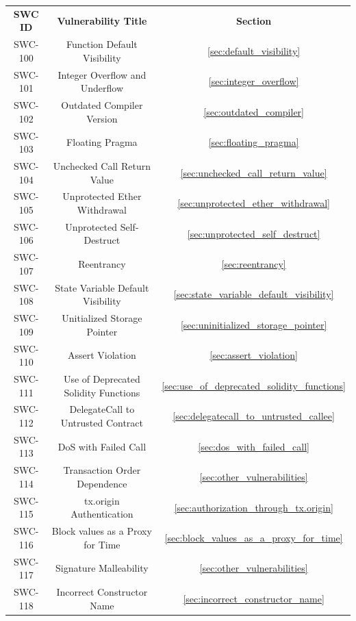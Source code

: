 \begin{table}
\begin{center}
    \begin{tabular}{ |c|c|c| } 
     \hline
     \textbf{SWC ID} & \textbf{Vulnerability Title} & \textbf{Section} \\
        SWC-100 & Function Default Visibility & \ref{sec:default_visibility}\\
        SWC-101 & Integer Overflow and Underflow & \ref{sec:integer_overflow} \\
        SWC-102 & Outdated Compiler Version & \ref{sec:outdated_compiler} \\
        SWC-103 & Floating Pragma & \ref{sec:floating_pragma} \\
        SWC-104 & Unchecked Call Return Value & \ref{sec:unchecked_call_return_value} \\
        SWC-105 & Unprotected Ether Withdrawal & \ref{sec:unprotected_ether_withdrawal} \\
        SWC-106 & Unprotected Self-Destruct & \ref{sec:unprotected_self_destruct} \\
        SWC-107 & Reentrancy & \ref{sec:reentrancy} \\
        SWC-108 & State Variable Default Visibility & \ref{sec:state_variable_default_visibility} \\
        SWC-109 & Unitialized Storage Pointer & \ref{sec:uninitialized_storage_pointer} \\
        SWC-110 & Assert Violation & \ref{sec:assert_violation} \\
        SWC-111 & Use of Deprecated Solidity Functions & \ref{sec:use_of_deprecated_solidity_functions} \\
        SWC-112 & DelegateCall to Untrusted Contract & \ref{sec:delegatecall_to_untrusted_callee} \\
        SWC-113 & DoS with Failed Call & \ref{sec:dos_with_failed_call} \\
        SWC-114 & Transaction Order Dependence & \ref{sec:other_vulnerabilities} \\
        SWC-115 & tx.origin Authentication & \ref{sec:authorization_through_tx.origin} \\
        SWC-116 & Block values as a Proxy for Time & \ref{sec:block_values_as_a_proxy_for_time} \\
        SWC-117 & Signature Malleability & \ref{sec:other_vulnerabilities} \\
        SWC-118 & Incorrect Constructor Name & \ref{sec:incorrect_constructor_name} \\

\end{tabular}
\end{center}
\end{table}
